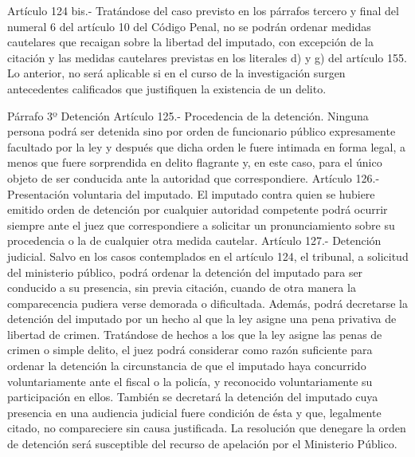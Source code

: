     Artículo 124 bis.- Tratándose del caso previsto en los párrafos tercero y final del numeral 6 del artículo 10 del Código Penal, no se podrán ordenar medidas cautelares que recaigan sobre la libertad del imputado, con excepción de la citación y las medidas cautelares previstas en los literales d) y g) del artículo 155. Lo anterior, no será aplicable si en el curso de la investigación surgen antecedentes calificados que justifiquen la existencia de un delito.


    Párrafo 3º Detención
    Artículo 125.- Procedencia de la detención. Ninguna persona podrá ser detenida sino por orden de funcionario público expresamente facultado por la ley y después que dicha orden le fuere intimada en forma legal, a menos que fuere sorprendida en delito flagrante y, en este caso, para el único objeto de ser conducida ante la autoridad que correspondiere.
    Artículo 126.- Presentación voluntaria del imputado. El imputado contra quien se hubiere emitido orden de detención por cualquier autoridad competente podrá ocurrir siempre ante el juez que correspondiere a solicitar un pronunciamiento sobre su procedencia o la de cualquier otra medida cautelar.
    Artículo 127.- Detención judicial. Salvo en los casos contemplados en el artículo 124, el tribunal, a solicitud del ministerio público, podrá ordenar la detención del imputado para ser conducido a su presencia, sin previa citación, cuando de otra manera la comparecencia pudiera verse demorada o dificultada.
    Además, podrá decretarse la detención del imputado por un hecho al que la ley asigne una pena privativa de libertad de crimen.
    Tratándose de hechos a los que la ley asigne las penas de crimen o simple delito, el juez podrá considerar como razón suficiente para ordenar la detención la circunstancia de que el imputado haya concurrido voluntariamente ante el fiscal o la policía, y reconocido voluntariamente su participación en ellos.
    También se decretará la detención del imputado cuya presencia en una audiencia judicial fuere condición de ésta y que, legalmente citado, no compareciere sin causa justificada.
    La resolución que denegare la orden de detención será susceptible del recurso de apelación por el Ministerio Público.


